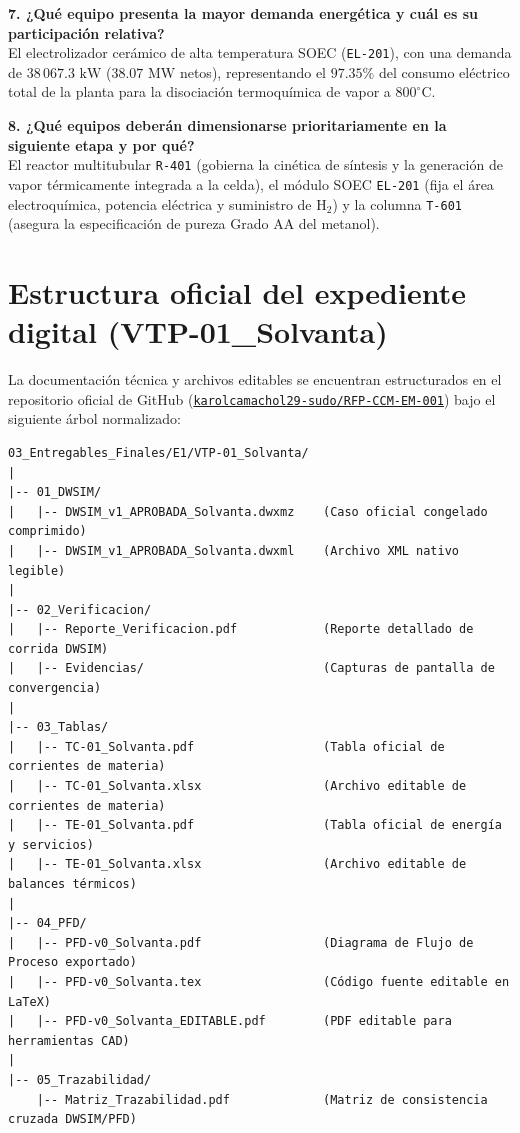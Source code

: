 \documentclass[11pt,letterpaper]{article}
\begin{document}
\textbf{7. ¿Qué equipo presenta la mayor demanda energética y cuál es su participación relativa?}\\
El electrolizador cerámico de alta temperatura SOEC (\texttt{EL-201}), con una demanda de $38\,067.3\text{ kW}$ ($38.07\text{ MW}$ netos), representando el $\mathbf{97.35\%}$ del consumo eléctrico total de la planta para la disociación termoquímica de vapor a $800^\circ\text{C}$.

\textbf{8. ¿Qué equipos deberán dimensionarse prioritariamente en la siguiente etapa y por qué?}\\
El reactor multitubular \texttt{R-401} (gobierna la cinética de síntesis y la generación de vapor térmicamente integrada a la celda), el módulo SOEC \texttt{EL-201} (fija el área electroquímica, potencia eléctrica y suministro de $\text{H}_2$) y la columna \texttt{T-601} (asegura la especificación de pureza Grado AA del metanol).

\clearpage

\section{Estructura oficial del expediente digital (VTP-01\_Solvanta)}

La documentación técnica y archivos editables se encuentran estructurados en el repositorio oficial de GitHub (\href{https://github.com/karolcamachol29-sudo/RFP-CCM-EM-001}{\texttt{karolcamachol29-sudo/RFP-CCM-EM-001}}) bajo el siguiente árbol normalizado:

{\small
\begin{verbatim}
03_Entregables_Finales/E1/VTP-01_Solvanta/
|
|-- 01_DWSIM/
|   |-- DWSIM_v1_APROBADA_Solvanta.dwxmz    (Caso oficial congelado comprimido)
|   |-- DWSIM_v1_APROBADA_Solvanta.dwxml    (Archivo XML nativo legible)
|
|-- 02_Verificacion/
|   |-- Reporte_Verificacion.pdf            (Reporte detallado de corrida DWSIM)
|   |-- Evidencias/                         (Capturas de pantalla de convergencia)
|
|-- 03_Tablas/
|   |-- TC-01_Solvanta.pdf                  (Tabla oficial de corrientes de materia)
|   |-- TC-01_Solvanta.xlsx                 (Archivo editable de corrientes de materia)
|   |-- TE-01_Solvanta.pdf                  (Tabla oficial de energía y servicios)
|   |-- TE-01_Solvanta.xlsx                 (Archivo editable de balances térmicos)
|
|-- 04_PFD/
|   |-- PFD-v0_Solvanta.pdf                 (Diagrama de Flujo de Proceso exportado)
|   |-- PFD-v0_Solvanta.tex                 (Código fuente editable en LaTeX)
|   |-- PFD-v0_Solvanta_EDITABLE.pdf        (PDF editable para herramientas CAD)
|
|-- 05_Trazabilidad/
    |-- Matriz_Trazabilidad.pdf             (Matriz de consistencia cruzada DWSIM/PFD)
\end{verbatim}
}
\end{document}
